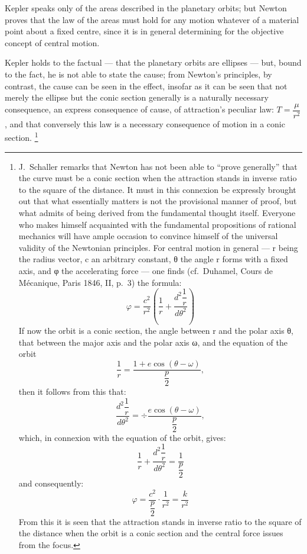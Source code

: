 \documentclass[12pt,a4paper]{book}
\begin{document}
Kepler speaks only of the areas described in the planetary orbits; but Newton proves that the law of the
areas must hold for any motion whatever of a material point about a fixed centre, since it is in general
determining for the objective concept of central motion.

Kepler holds to the factual --- that the planetary orbits are ellipses --- but, bound to the fact, he is not
able to state the cause; from Newton's principles, by contrast, the cause can be seen in the effect, insofar
as it can be seen that not merely the ellipse but the conic section generally is a naturally necessary
consequence, an express consequence of cause, of attraction's peculiar law:
$T = \dfrac{\mu}{r^{2}}$, and that conversely this law
is a necessary consequence of motion in a conic section.%
\footnote{%
J.\ Schaller remarks that Newton has not been able to ``prove generally'' that the curve must be a conic
section when the attraction stands in inverse ratio to the square of the distance. It must in this connexion
be expressly brought out that what essentially matters is not the provisional manner of proof, but what
admits of being derived from the fundamental thought itself. Everyone who makes himself acquainted with the
fundamental propositions of rational mechanics will have ample occasion to convince himself of the universal
validity of the Newtonian principles. For central motion in general --- r being the radius vector, c an
arbitrary constant, θ the angle r forms with a fixed axis, and φ the accelerating force --- one finds (cf.\
Duhamel, Cours de Mécanique, Paris 1846, II, p.\ 3) the formula:
\[
\varphi = \frac{c^{2}}{r^{2}} \left( \frac{1}{r} +
    \frac{d^{2}\dfrac{1}{r}}{d \theta^{2}} \right)
\]
If now the orbit is a conic section, the angle between r and the polar axis θ, that between the major axis
and the polar axis ω, and the equation of the orbit
\[
\frac{1}{r} = \frac{1 + e \cos (\theta - \omega)}{\dfrac{p}{2}},
\]
then it follows from this that:
\[
\frac{d^{2}\dfrac{1}{r}}{d \theta^{2}} = \div \frac{e \cos (\theta - \omega)}{\dfrac{p}{2}},
\]
which, in connexion with the equation of the orbit, gives:
\[
\frac{1}{r} + \frac{d^{2}\dfrac{1}{r}}{d \theta^{2}} = \frac{1}{\dfrac{p}{2}}
\]
and consequently:
\[
\varphi = \frac{c^{2}}{\dfrac{p}{2}} \cdot \frac{1}{r^{2}} = \frac{k}{r^{2}}
\]
From this it is seen that the attraction stands in inverse ratio to the square of the distance when the orbit
is a conic section and the central force issues from the focus.}
\end{document}
